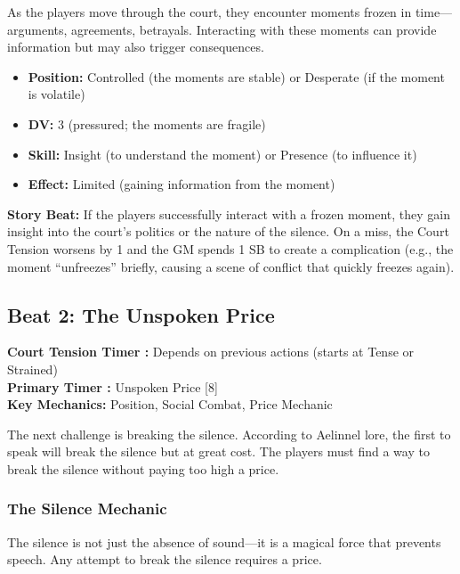 \documentclass{article}
\begin{document}
As the players move through the court, they encounter moments frozen in time---arguments, agreements, betrayals. Interacting with these moments can provide information but may also trigger consequences.

\begin{itemize}
    \item \textbf{Position:} Controlled (the moments are stable) or Desperate (if the moment is volatile)
    \item \textbf{DV:} 3 (pressured; the moments are fragile)
    \item \textbf{Skill:} Insight (to understand the moment) or Presence (to influence it)
    \item \textbf{Effect:} Limited (gaining information from the moment)
\end{itemize}

\begin{storybox}
\textbf{Story Beat:} If the players successfully interact with a frozen moment, they gain insight into the court's politics or the nature of the silence. On a miss, the Court Tension worsens by 1 and the GM spends 1 SB to create a complication (e.g., the moment ``unfreezes'' briefly, causing a scene of conflict that quickly freezes again).
\end{storybox}

\subsection{Beat 2: The Unspoken Price}

\begin{mechanicbox}
\textbf{Court Tension Timer :} Depends on previous actions (starts at Tense or Strained) \\
\textbf{Primary Timer :} Unspoken Price [8] \\
\textbf{Key Mechanics:} Position, Social Combat, Price Mechanic
\end{mechanicbox}

The next challenge is breaking the silence. According to Aelinnel lore, the first to speak will break the silence but at great cost. The players must find a way to break the silence without paying too high a price.

\subsubsection{The Silence Mechanic}

The silence is not just the absence of sound---it is a magical force that prevents speech. Any attempt to break the silence requires a price.
\end{document}
